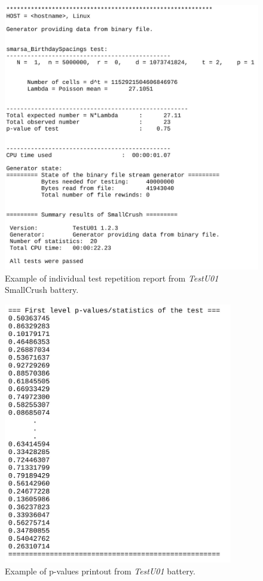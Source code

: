 \documentclass[
  digital,     %
  oneside,     %
  nosansbold,  %
  nocolorbold, %
  nolof,         %
  nolot,         %
]{fithesis4}
\begin{document}
\begin{figure}[h]
  \begin{center}
    \includegraphics[width=12.5cm]{figures/outputs-appendix/tu01single.jpg}
  \end{center}
  \caption{Example of individual test repetition
   report from \emph{TestU01} SmallCrush battery. }
  \label{fig:tu01single}
\end{figure}

\newpage

\begin{figure}[h]
  \begin{center}
    \includegraphics[width=10cm]{figures/outputs-appendix/testu01pvalues.jpg}
  \end{center}
  \caption{Example of p-values printout from \emph{TestU01} battery.}
  \label{fig:tu01pvalues}
\end{figure}
\end{document}

